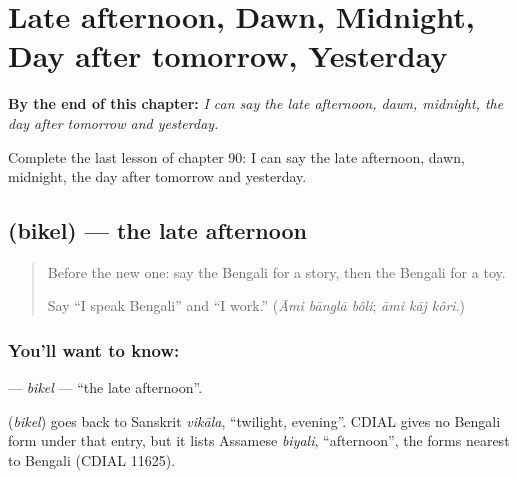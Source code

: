 
\chapter{Late afternoon, Dawn, Midnight, Day after tomorrow, Yesterday}
\label{ch:bn-late-afternoon-dawn-midnight-day-after-tomorrow-yesterday}

\begin{chapteropening}
\textbf{By the end of this chapter:} \emph{I can say the late afternoon, dawn, midnight, the day after tomorrow and yesterday.}

Complete the last lesson of chapter 90: I can say the late afternoon, dawn, midnight, the day after tomorrow and yesterday.
\end{chapteropening}

\section[\texorpdfstring{\bn{বিকেল} (bikel)}{বিকেল (bikel)}]{ (bikel) — the late afternoon}

\label{lesson:BN-C90-bikel}



\begin{quote}
Before the new one: say the Bengali for a story, then the Bengali for a toy.

Say \textquotedblleft{}I speak Bengali\textquotedblright{} and \textquotedblleft{}I work.\textquotedblright{} (\emph{Āmi bānglā bôli}; \emph{āmi kāj kôri}.)
\end{quote}

\subsection*{You'll want to know: }
\textbf{} — \emph{bikel} — \textquotedblleft{}the late afternoon\textquotedblright{}.

\begin{cousinweb}
\textbf{} (\emph{bikel}) goes back to Sanskrit \emph{vikāla}, \textquotedblleft{}twilight, evening\textquotedblright{}. CDIAL gives no Bengali form under that entry, but it lists Assamese \emph{biyali}, \textquotedblleft{}afternoon\textquotedblright{}, the forms nearest to Bengali (CDIAL 11625).
\end{cousinweb}

